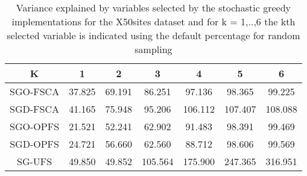 \begin{table}
	\begin{center}
		\begin{tabular}{c c c c c c c}
			K & 1 & 2 & 3 & 4 & 5 & 6 \\
			\hline
			SGO-FSCA & 37.825 & 69.191 & 86.251 & 97.136 & 98.365 & 99.225 \\
			SGD-FSCA & 41.165 & 75.948 & 95.206 & 106.112 & 107.407 & 108.088 \\
			SGO-OPFS & 21.521 & 52.241 & 62.902 & 91.483 & 98.391 & 99.469 \\
			SGD-OPFS & 24.721 & 56.660 & 62.560 & 88.712 & 98.606 & 99.569 \\
			SG-UFS & 49.850 & 49.852 & 105.564 & 175.900 & 247.365 & 316.951 \\
		\end{tabular}
	\end{center}
	\caption{Variance explained by variables selected by the stochastic greedy implementations for the X50sites dataset and for k = 1,..,6 the kth selected variable is indicated using the default percentage for random sampling}
\end{table}